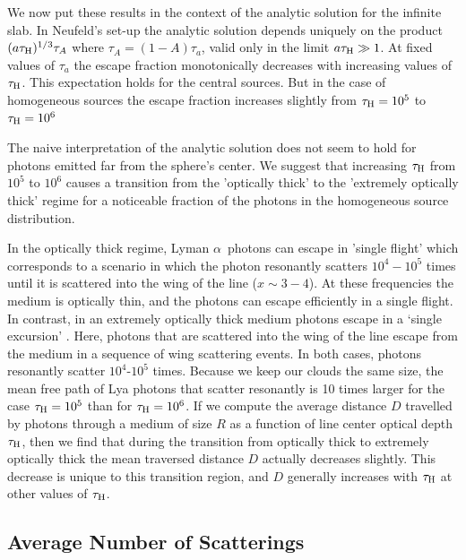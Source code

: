 \documentclass{emulateapj}
\newcommand{\ly}{{\ifmmode{{\rm Ly}\alpha~}\else{Ly$\alpha$~}\fi}}
\newcommand{\lya}{{Lyman $\alpha$~}}
\begin{document}
We now put these results in the context of the analytic solution for
the infinite slab\citep{Neufeld90}.   
In Neufeld's set-up the analytic solution depends
uniquely on the product $(a\tau_{\rm   H})^{1/3}\tau_{A}$ where
$\tau_{A} = (1 - A)\tau_{a}$, valid only in the limit $a\tau_{\rm
  H}\gg 1$. 
At fixed values of $\tau_{a}$ the escape fraction monotonically
decreases with increasing values of $\tau_{\rm H}$. 
This expectation holds for the central sources. 
But in the case of homogeneous sources the escape fraction increases
slightly from $\tau_{\rm H}=10^5$ to $\tau_{\rm H}=10^{6}$ 


The naive interpretation of the analytic solution does not seem to
hold for photons emitted far from the sphere's center. 
We suggest that increasing $\tau_{\rm H}$ from $10^{5}$ to $10^{6}$ causes a
transition from the 'optically thick' to  the 'extremely optically
thick' regime for a noticeable fraction of the photons in the
homogeneous source distribution.

In the optically thick regime, \lya  photons can escape in
'single flight' which corresponds to a scenario in which the
photon resonantly scatters $10^4-10^5$ times until it is scattered
into the wing of the line ($x\sim 3-4$). 
At these frequencies the medium is optically thin, and the photons can
escape efficiently in a single flight. 
In contrast, in an extremely optically thick medium \ly
  photons escape in a `single excursion' \citep{Adams72}. 
Here, photons that are scattered into the wing of the line escape from
the medium in a sequence of wing scattering events. 
In both cases, \ly photons resonantly scatter $10^4$-$10^5$ times. 
Because we keep our clouds the same size, the mean free path of Lya
photons that scatter resonantly is 10 times larger for the case
$\tau_{\rm H}=10^5$ than for $\tau_{\rm H}=10^6$. 
If we compute the average distance $D$ travelled by \ly
photons through a medium of size $R$ as a function of line center
optical depth $\tau_{\rm H}$, then we find that during the transition
from optically thick to extremely optically thick the mean traversed
distance $D$ actually decreases slightly.  
This decrease is unique to this transition region, and $D$ generally
increases with $\tau_{\rm H}$ at other values of $\tau_{\rm H}$.   

\subsection{Average Number of Scatterings}
\label{sec:scatterings}
\end{document}
